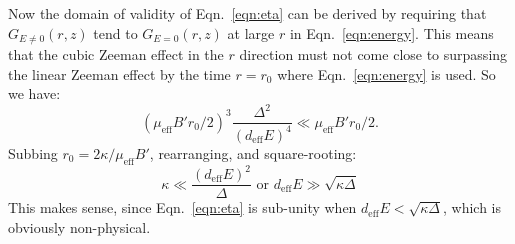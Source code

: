 \documentclass[%
 reprint,
 amsmath,amssymb,
 aps,
pra,
]{revtex4-1}
\begin{document}
Now the domain of validity of Eqn.~\ref{eqn:eta} can be derived by requiring that $G_{E\ne0}(r,z)$ tend to $G_{E=0}(r,z)$ at large $r$ in Eqn.~\ref{eqn:energy}.
This means that the cubic Zeeman effect in the $r$ direction must not come close to surpassing the linear Zeeman effect by the time $r=r_0$ where Eqn.~\ref{eqn:energy} is used.
So we have:
\begin{equation}
\label{eqn:limits}
(\mu_\text{eff}B'r_0/2)^3\frac{\Delta^2}{(d_\text{eff}E)^4} \ll \mu_\text{eff}B'r_0/2.
\end{equation}
Subbing $r_0=2\kappa/\mu_\text{eff}B'$, rearranging, and square-rooting:
\begin{equation}
\kappa\ll\frac{(d_\text{eff}E)^2}{\Delta}\text{  or  }d_\text{eff}E\gg\sqrt{\kappa\Delta}
\end{equation}
This makes sense, since Eqn.~\ref{eqn:eta} is sub-unity when $d_\text{eff}E<\sqrt{\kappa\Delta}$, which is obviously non-physical.


\end{document}
